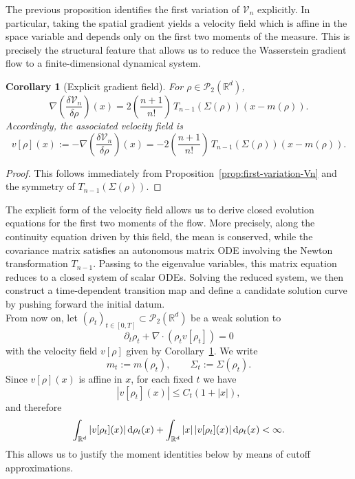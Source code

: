 \documentclass[11pt,reqno]{amsart}
\numberwithin{figure}{section}
\def\d {{\partial}}
\def\d{\mathrm{d}}
\renewcommand{\d}{  {\textup{d}} }
\newtheorem{corollary}{Corollary}[section]
\begin{document}
The previous proposition identifies the first variation of $\mathcal V_n$ explicitly. In particular, taking the spatial gradient yields a velocity field which is affine in the space variable and depends only on the first two moments of the measure. This is precisely the structural feature that allows us to reduce the Wasserstein gradient flow to a finite-dimensional dynamical system.

\begin{corollary}[Explicit gradient field]
	\label{cor:explicit-gradient-field}
	For $\rho\in\mathcal P_2(\mathbb R^d)$,
	\[
	\nabla\!\left(\frac{\delta\mathcal V_n}{\delta\rho}\right)(x)
	=
	2\left(\frac{n+1}{n!}\right)\,T_{n-1}(\Sigma(\rho))(x-m(\rho)).
	\]
	Accordingly, the associated velocity field is
	\[
	v[\rho](x)
	:=
	-\nabla\!\left(\frac{\delta\mathcal V_n}{\delta\rho}\right)(x)
	=
	-2\left(\frac{n+1}{n!}\right)\,T_{n-1}(\Sigma(\rho))(x-m(\rho)).
	\]
\end{corollary}

\begin{proof}
	This follows immediately from Proposition~\ref{prop:first-variation-Vn} and the symmetry of
	$T_{n-1}(\Sigma(\rho))$.
\end{proof}


The explicit form of the velocity field allows us to derive closed evolution equations for the first two moments of the flow. More precisely, along the continuity equation driven by this field, the mean is conserved, while the covariance matrix satisfies an autonomous matrix ODE involving the Newton transformation $T_{n-1}$. Passing to the eigenvalue variables, this matrix equation reduces to a closed system of scalar ODEs. Solving the reduced system, we then construct a time-dependent transition map and define a candidate solution curve by pushing forward the initial datum.\\

From now on, let $(\rho_t)_{t\in[0,T]}\subset \mathcal P_2(\mathbb R^d)$ be a weak solution to \[ \partial_t\rho_t+\nabla\cdot(\rho_t v[\rho_t])=0 \] with the velocity field $v[\rho]$ given by Corollary~\ref{cor:explicit-gradient-field}. We write \[ m_t:=m(\rho_t), \qquad \Sigma_t:=\Sigma(\rho_t). \] Since $v[\rho](x)$ is affine in $x$, for each fixed $t$ we have \[ |v[\rho_t](x)|\le C_t(1+|x|), \] and therefore \[ \int_{\mathbb R^d}|v[\rho_t](x)|\,\d\rho_t(x) + \int_{\mathbb R^d}|x|\,|v[\rho_t](x)|\,\d\rho_t(x) <\infty. \] This allows us to justify the moment identities below by means of cutoff approximations.
\end{document}
